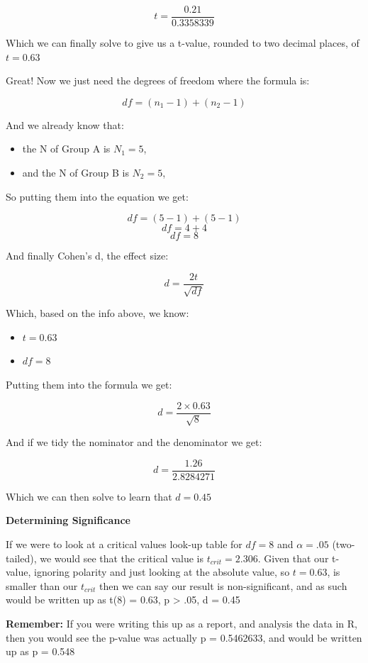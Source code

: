 \documentclass[
  oneside]{book}
\providecommand{\tightlist}{%
  \setlength{\itemsep}{0pt}\setlength{\parskip}{0pt}}
\begin{document}
\[t = \frac{0.21}{0.3358339}\]

Which we can finally solve to give us a t-value, rounded to two decimal places, of \(t = 0.63\)

Great! Now we just need the degrees of freedom where the formula is:

\[df = (n_1 - 1) + (n_2 - 1)\]

And we already know that:

\begin{itemize}
\tightlist
\item
  the N of Group A is \(N_1 = 5\),
\item
  and the N of Group B is \(N_2 = 5\),
\end{itemize}

So putting them into the equation we get:

\[df = (5 - 1) + (5 - 1)\]
\[df = 4 + 4\]
\[df = 8\]

And finally Cohen's d, the effect size:

\[d = \frac{2t}{\sqrt{df}}\]

Which, based on the info above, we know:

\begin{itemize}
\tightlist
\item
  \(t = 0.63\)
\item
  \(df = 8\)
\end{itemize}

Putting them into the formula we get:

\[d = \frac{2 \times 0.63}{\sqrt{8}}\]

And if we tidy the nominator and the denominator we get:

\[d = \frac{1.26}{2.8284271}\]

Which we can then solve to learn that \(d = 0.45\)

\textbf{Determining Significance}

If we were to look at a critical values look-up table for \(df = 8\) and \(\alpha = .05\) (two-tailed), we would see that the critical value is \(t_{crit} = 2.306\). Given that our t-value, ignoring polarity and just looking at the absolute value, so \(t = 0.63\), is smaller than our \(t_{crit}\) then we can say our result is non-significant, and as such would be written up as t(8) = 0.63, p \textgreater{} .05, d = 0.45

\textbf{Remember:} If you were writing this up as a report, and analysis the data in R, then you would see the p-value was actually p = 0.5462633, and would be written up as p = 0.548
\end{document}
